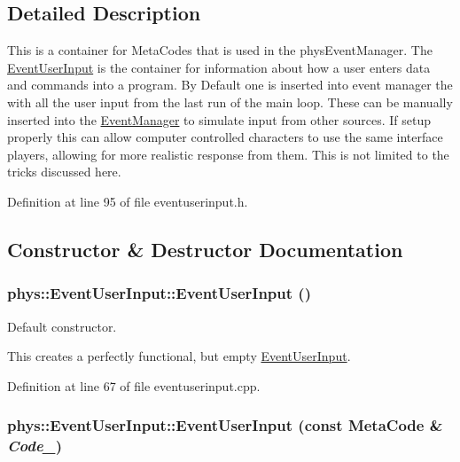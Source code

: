 \subsection{Detailed Description}
This is a container for MetaCodes that is used in the physEventManager. The \hyperlink{classphys_1_1EventUserInput}{EventUserInput} is the container for information about how a user enters data and commands into a program. By Default one is inserted into event manager the with all the user input from the last run of the main loop. These can be manually inserted into the \hyperlink{classphys_1_1EventManager}{EventManager} to simulate input from other sources. If setup properly this can allow computer controlled characters to use the same interface players, allowing for more realistic response from them. This is not limited to the tricks discussed here. 

Definition at line 95 of file eventuserinput.h.



\subsection{Constructor \& Destructor Documentation}
\hypertarget{classphys_1_1EventUserInput_ae7358d184021306da8979000c225845e}{
\subsubsection[{EventUserInput}]{\setlength{\rightskip}{0pt plus 5cm}phys::EventUserInput::EventUserInput ()}}
\label{d7/df5/classphys_1_1EventUserInput_ae7358d184021306da8979000c225845e}


Default constructor. 

This creates a perfectly functional, but empty \hyperlink{classphys_1_1EventUserInput}{EventUserInput}. 

Definition at line 67 of file eventuserinput.cpp.

\hypertarget{classphys_1_1EventUserInput_af54d4604d18b25a2dc99a4a3090b9f1d}{
\subsubsection[{EventUserInput}]{\setlength{\rightskip}{0pt plus 5cm}phys::EventUserInput::EventUserInput (const {\bf MetaCode} \& {\em Code\_\-})}}
\label{d7/df5/classphys_1_1EventUserInput_af54d4604d18b25a2dc99a4a3090b9f1d}


